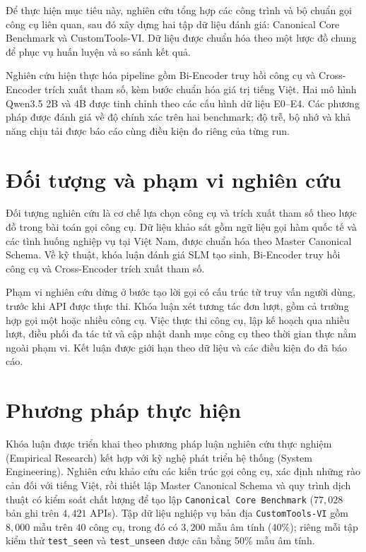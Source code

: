 Để thực hiện mục tiêu này, nghiên cứu tổng hợp các công trình và bộ chuẩn gọi công cụ liên quan, sau đó xây dựng hai tập dữ liệu đánh giá: Canonical Core Benchmark và CustomTools-VI. Dữ liệu được chuẩn hóa theo một lược đồ chung để phục vụ huấn luyện và so sánh kết quả.

Nghiên cứu hiện thực hóa pipeline gồm Bi-Encoder truy hồi công cụ và Cross-Encoder trích xuất tham số, kèm bước chuẩn hóa giá trị tiếng Việt. Hai mô hình Qwen3.5 2B và 4B được tinh chỉnh theo các cấu hình dữ liệu E0–E4. Các phương pháp được đánh giá về độ chính xác trên hai benchmark; độ trễ, bộ nhớ và khả năng chịu tải được báo cáo cùng điều kiện đo riêng của từng run.

\section{Đối tượng và phạm vi nghiên cứu}
Đối tượng nghiên cứu là cơ chế lựa chọn công cụ và trích xuất tham số theo lược đồ trong bài toán gọi công cụ. Dữ liệu khảo sát gồm ngữ liệu gọi hàm quốc tế và các tình huống nghiệp vụ tại Việt Nam, được chuẩn hóa theo Master Canonical Schema. Về kỹ thuật, khóa luận đánh giá SLM tạo sinh, Bi-Encoder truy hồi công cụ và Cross-Encoder trích xuất tham số.

Phạm vi nghiên cứu dừng ở bước tạo lời gọi có cấu trúc từ truy vấn người dùng, trước khi API được thực thi. Khóa luận xét tương tác đơn lượt, gồm cả trường hợp gọi một hoặc nhiều công cụ. Việc thực thi công cụ, lập kế hoạch qua nhiều lượt, điều phối đa tác tử và cập nhật danh mục công cụ theo thời gian thực nằm ngoài phạm vi. Kết luận được giới hạn theo dữ liệu và các điều kiện đo đã báo cáo.

\section{Phương pháp thực hiện}
Khóa luận được triển khai theo phương pháp luận nghiên cứu thực nghiệm (Empirical Research) kết hợp với kỹ nghệ phát triển hệ thống (System Engineering). Nghiên cứu khảo cứu các kiến trúc gọi công cụ, xác định những rào cản đối với tiếng Việt, rồi thiết lập Master Canonical Schema và quy trình dịch thuật có kiểm soát chất lượng để tạo lập \texttt{Canonical Core Benchmark} ($77{,}028$ bản ghi trên $4{,}421$ APIs). Tập dữ liệu nghiệp vụ bản địa \texttt{CustomTools-VI} gồm $8{,}000$ mẫu trên $40$ công cụ, trong đó có $3{,}200$ mẫu âm tính (40\%); riêng mỗi tập kiểm thử \texttt{test_seen} và \texttt{test_unseen} được cân bằng 50\% mẫu âm tính.

